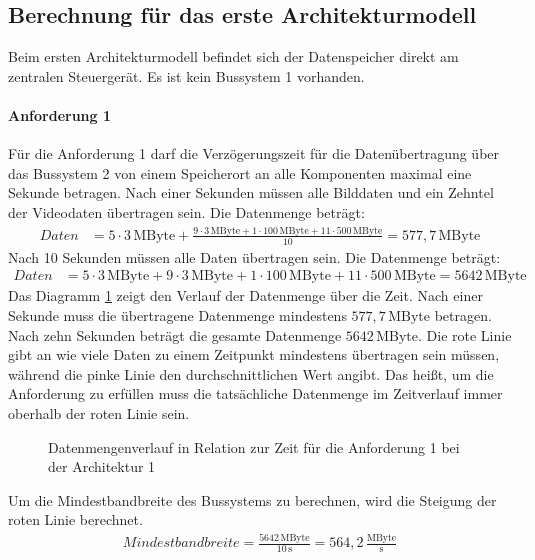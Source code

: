 \subsection{Berechnung für das erste Architekturmodell}
Beim ersten Architekturmodell befindet sich der Datenspeicher direkt am zentralen Steuergerät. Es ist kein Bussystem 1 vorhanden.
\paragraph{Anforderung 1}
Für die Anforderung 1 darf die Verzögerungszeit für die Datenübertragung über das Bussystem 2 von einem Speicherort an alle Komponenten maximal eine Sekunde betragen. 
Nach einer Sekunden müssen alle Bilddaten und ein Zehntel der Videodaten übertragen sein. Die Datenmenge beträgt:
\begin{align}
	Daten &= 5 \cdot 3\,\mathrm{MByte} + \frac{9 \cdot 3 \,\mathrm{MByte} + 1 \cdot 100\,\mathrm{MByte} + 11 \cdot 500\,\mathrm{MByte}}{10} =  577,7\,\mathrm{MByte}
\end{align}
Nach 10 Sekunden müssen alle Daten übertragen sein. Die Datenmenge beträgt:
\begin{align}
	Daten &= 5 \cdot 3\,\mathrm{MByte} + 9 \cdot 3 \,\mathrm{MByte} + 1 \cdot 100\,\mathrm{MByte} + 11 \cdot 500\,\mathrm{MByte} =  5642\,\mathrm{MByte}
\end{align}
Das Diagramm \ref{fig:arch1anf1} zeigt den Verlauf der Datenmenge über die Zeit. Nach einer Sekunde muss die übertragene Datenmenge mindestens $ 577,7\,\mathrm{MByte} $ betragen. Nach zehn Sekunden beträgt die gesamte Datenmenge $ 5642\,\mathrm{MByte} $. Die rote Linie gibt an wie viele Daten zu einem Zeitpunkt mindestens übertragen sein müssen, während die pinke Linie den durchschnittlichen Wert angibt. Das heißt, um die Anforderung zu erfüllen muss die tatsächliche Datenmenge im Zeitverlauf immer oberhalb der roten Linie sein.
\begin{figure}[]
	\centering
	
	\caption[Datenmengenverlauf in Relation zur Zeit für die Anforderung 1 bei der Architektur 1]{Datenmengenverlauf in Relation zur Zeit für die Anforderung 1 bei der Architektur 1}
	\label{fig:arch1anf1}
\end{figure}
Um die Mindestbandbreite des Bussystems zu berechnen, wird die Steigung der roten Linie berechnet.
\begin{align}
	Mindestbandbreite = \frac{5642\,\mathrm{MByte}}{10\,\mathrm{s}} = 564,2\,\frac{\mathrm{MByte}}{\mathrm{s}}
\end{align}
